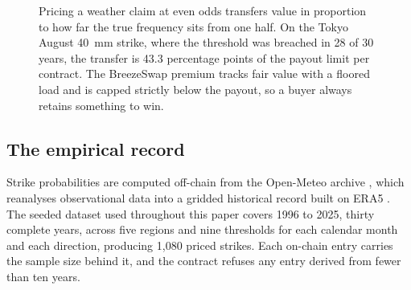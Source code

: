 \documentclass[11pt,a4paper]{article}
\begin{document}
\begin{figure}[h]
\centering
{}
\caption{Pricing a weather claim at even odds transfers value in proportion to how far the
true frequency sits from one half. On the Tokyo August 40~mm strike, where the threshold was
breached in 28 of 30 years, the transfer is 43.3 percentage points of the payout limit per
contract. The BreezeSwap premium tracks fair value with a floored load and is capped strictly
below the payout, so a buyer always retains something to win.}
\label{fig:premium}
\end{figure}

\subsection{The empirical record}

Strike probabilities are computed off-chain from the Open-Meteo archive
\cite{openmeteo}, which reanalyses observational data into a gridded historical record built
on ERA5 \cite{hersbach2020}. The seeded dataset used throughout this paper covers 1996 to
2025, thirty complete years, across five regions and nine thresholds for each calendar month
and each direction, producing 1{,}080 priced strikes. Each on-chain entry carries the sample
size behind it, and the contract refuses any entry derived from fewer than ten years.
\end{document}
